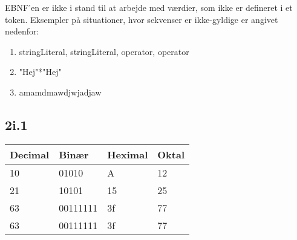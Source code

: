 EBNF'en er ikke i stand til at arbejde med værdier, som ikke er defineret i et token. Eksempler på situationer, hvor sekvenser er ikke-gyldige er angivet nedenfor:
\newline
\begin{enumerate}
\item{stringLiteral, stringLiteral, operator, operator}
\item{"Hej"*"Hej"}
\item{amamdmawdjwjadjaw}
\end{enumerate}


\subsection*{2i.1}
\begin{center}
    \begin{tabular}{ | l | l | l | l |}
    \hline
    Decimal & Binær & Heximal & Oktal \\ \hline
    10 & 01010 & A & 12 \\ \hline
    21 & 10101 & 15 & 25 \\ \hline
    63 & 00111111 & 3f & 77 \\ \hline
    63 & 00111111 & 3f & 77 \\
    \hline
    \end{tabular}
\end{center}

